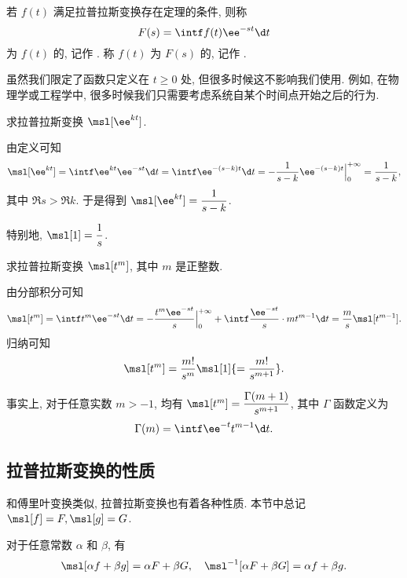 \begin{definition}
  若 $f(t)$ 满足拉普拉斯变换存在定理的条件, 则称
  \[
    F(s)=\intf f(t)\ee^{-st}\d t
  \]
  为 $f(t)$ 的, 记作 \nouns{$\msl[f(t)]$}.
  称 $f(t)$ 为 $F(s)$ 的, 记作 .
\end{definition}

虽然我们限定了函数只定义在 $t\ge 0$ 处, 但很多时候这不影响我们使用.
例如, 在物理学或工程学中, 很多时候我们只需要考虑系统自某个时间点开始之后的行为.

\begin{example}
  求拉普拉斯变换 $\msl[\ee^{kt}]$.
\end{example}

\begin{solution}
  由定义可知
  \[
     \msl[\ee^{kt}]
    =\intf\ee^{kt}\ee^{-st}\d t
    =\intf\ee^{-(s-k)t}\d t
    =-\frac1{s-k}\ee^{-(s-k)t}\Big|_0^{+\infty}
    =\frac1{s-k},
  \]
  其中 $\Re s>\Re k$.
  于是得到 $\msl[\ee^{kt}]=\dfrac1{s-k}$.
\end{solution}

特别地, $\msl[1]=\dfrac1s$.

\begin{example}
  求拉普拉斯变换 $\msl[t^m]$, 其中 $m$ 是正整数.
\end{example}

\begin{solution}
  由分部积分可知
  \[
     \msl[t^m]
    =\intf t^m\ee^{-st}\d t
    =-\frac{t^m\ee^{-st}}s\Big|_0^{+\infty}+\intf\frac{\ee^{-st}}s\cdot mt^{m-1}\d t
    =\frac ms\msl[t^{m-1}].
  \]
  归纳可知
  \[
    \msl[t^m]=\dfrac{m!}{s^m}\msl[1]{=\dfrac{m!}{s^{m+1}}}.
  \]
\end{solution}

事实上, 对于任意实数 $m>-1$, 均有 $\msl[t^m]=\dfrac{\Gamma(m+1)}{s^{m+1}}$, 其中 $\Gamma$ 函数定义为
\[
  \Gamma(m)=\intf \ee^{-t}t^{m-1}\d t.
\]

\subsection{拉普拉斯变换的性质}

和傅里叶变换类似, 拉普拉斯变换也有着各种性质.
本节中总记 $\msl[f]=F,\msl[g]=G$.

\begin{theorem}[线性性质]
  对于任意常数 $\alpha$ 和 $\beta$, 有
  \[
    \msl[\alpha f+\beta g]=\alpha F+\beta G,\quad
    \msl^{-1}[\alpha F+\beta G]=\alpha f+\beta g.
  \]
\end{theorem}

